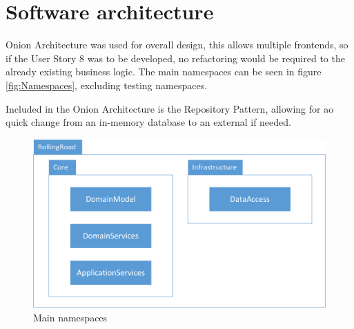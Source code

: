 \chapter{Software architecture}


Onion Architecture was used for overall design, this allows multiple frontends, so if the User Story 8 was to be developed, no refactoring would be required to the already existing business logic. The main namespaces can be seen in figure \vref{fig:Namespaces}, excluding testing namespaces.

Included in the Onion Architecture is the Repository Pattern, allowing for ao quick change from an in-memory database to an external if needed.

\begin{figure}
\centering
\includegraphics[width=0.7\linewidth]{Images/Namespaces}
\caption{Main namespaces}
\label{fig:Namespaces}
\end{figure}
